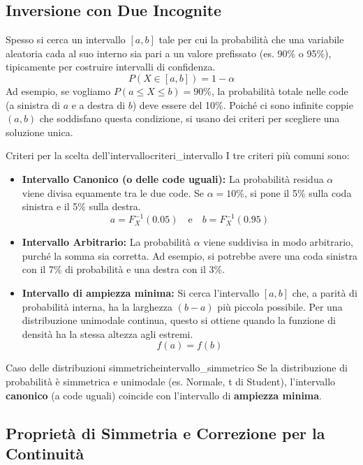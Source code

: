 \subsection{Inversione con Due Incognite}\label{ssec:inversione_due_incognite}
Spesso si cerca un intervallo \( [a, b] \) tale per cui la probabilità che una variabile aleatoria cada al suo interno sia pari a un valore prefissato (es. 90\% o 95\%), tipicamente per costruire intervalli di confidenza.
\[
P(X \in [a, b]) = 1 - \alpha
\]
Ad esempio, se vogliamo \( P(a \le X \le b) = 90\% \), la probabilità totale nelle code (a sinistra di \(a\) e a destra di \(b\)) deve essere del 10\%. Poiché ci sono infinite coppie \( (a, b) \) che soddisfano questa condizione, si usano dei criteri per scegliere una soluzione unica.

\begin{nota}{Criteri per la scelta dell'intervallo}{criteri_intervallo}
I tre criteri più comuni sono:
\begin{itemize}
    \item \textbf{Intervallo Canonico (o delle code uguali):} La probabilità residua \( \alpha \) viene divisa equamente tra le due code. Se \( \alpha = 10\% \), si pone il 5\% sulla coda sinistra e il 5\% sulla destra.
    \[
    a = F_X^{-1}(0.05) \quad \text{e} \quad b = F_X^{-1}(0.95)
    \]
    \item \textbf{Intervallo Arbitrario:} La probabilità \( \alpha \) viene suddivisa in modo arbitrario, purché la somma sia corretta. Ad esempio, si potrebbe avere una coda sinistra con il 7\% di probabilità e una destra con il 3\%.
    \item \textbf{Intervallo di ampiezza minima:} Si cerca l'intervallo \( [a, b] \) che, a parità di probabilità interna, ha la larghezza \( (b-a) \) più piccola possibile. Per una distribuzione unimodale continua, questo si ottiene quando la funzione di densità ha la stessa altezza agli estremi.
    \[
    f(a) = f(b)
    \]
\end{itemize}
\end{nota}

\begin{nota}{Caso delle distribuzioni simmetriche}{intervallo_simmetrico}
Se la distribuzione di probabilità è simmetrica e unimodale (es. Normale, t di Student), l'intervallo \textbf{canonico} (a code uguali) coincide con l'intervallo di \textbf{ampiezza minima}.
\end{nota}

\subsection{Proprietà di Simmetria e Correzione per la Continuità}

